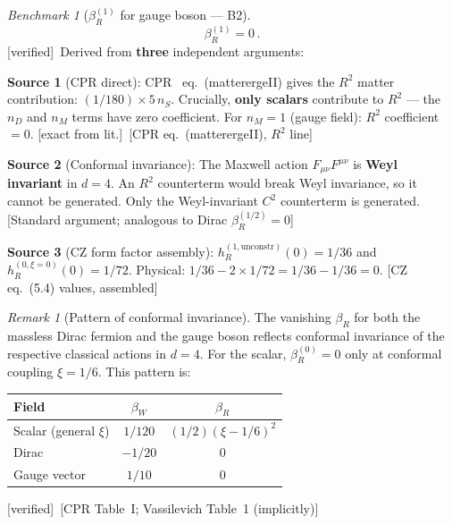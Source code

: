 \documentclass[12pt,a4paper]{article}
\theoremstyle{definition}
\theoremstyle{remark}
\newtheorem{remark}[proposition]{Remark}
\newtheorem{benchmark}[proposition]{Benchmark}
\newcommand{\fromlit}[1]{\textcolor{blue!70!black}{\textsf{[#1]}}}
\newcommand{\exactlit}{\textcolor{blue!60!black}{\textsf{[exact from lit.]}}}
\newcommand{\verified}{\textcolor{green!50!black}{\textsf{[verified]}}}
\begin{document}
\begin{benchmark}[$\beta_R^{(1)}$ for gauge boson --- B2]
\label{bench:beta-R}
\begin{equation}
  \boxed{
  \beta_R^{(1)} = 0\,.
  }
  \label{eq:beta-R-vector}
\end{equation}
\verified\ Derived from \textbf{three} independent arguments:

\medskip\noindent
\textbf{Source 1} (CPR direct):
CPR~\cite{CPR2009} eq.~(matterergeII) gives the $R^2$ matter
contribution: $(1/180) \times 5\,n_S$.
Crucially, \textbf{only scalars} contribute to $R^2$ ---
the $n_D$ and $n_M$ terms have zero coefficient.
For $n_M = 1$ (gauge field): $R^2$ coefficient $= 0$.
\exactlit\ \fromlit{CPR eq.~(matterergeII), $R^2$ line}

\medskip\noindent
\textbf{Source 2} (Conformal invariance):
The Maxwell action $F_{\mu\nu}F^{\mu\nu}$ is \textbf{Weyl invariant}
in $d = 4$.  An $R^2$ counterterm would break Weyl invariance,
so it cannot be generated.  Only the Weyl-invariant $C^2$ counterterm
is generated.
\fromlit{Standard argument; analogous to Dirac $\beta_R^{(1/2)} = 0$}

\medskip\noindent
\textbf{Source 3} (CZ form factor assembly):
$h_R^{(1,\mathrm{unconstr})}(0) = 1/36$ and
$h_R^{(0,\xi=0)}(0) = 1/72$.
Physical: $1/36 - 2 \times 1/72 = 1/36 - 1/36 = 0$.
\fromlit{CZ eq.~(5.4) values, assembled}
\end{benchmark}

\begin{remark}[Pattern of conformal invariance]
The vanishing $\beta_R$ for both the massless Dirac fermion and the
gauge boson reflects conformal invariance of the respective classical
actions in $d = 4$.  For the scalar, $\beta_R^{(0)} = 0$ only at
conformal coupling $\xi = 1/6$.  This pattern is:
\begin{center}
\begin{tabular}{lcc}
\toprule
\textbf{Field} & $\beta_W$ & $\beta_R$ \\
\midrule
Scalar (general $\xi$) & $1/120$ & $(1/2)(\xi-1/6)^2$ \\
Dirac & $-1/20$ & $0$ \\
Gauge vector & $1/10$ & $0$ \\
\bottomrule
\end{tabular}
\end{center}
\verified\ \fromlit{CPR Table~I; Vassilevich Table~1 (implicitly)}
\end{remark}


\end{document}
